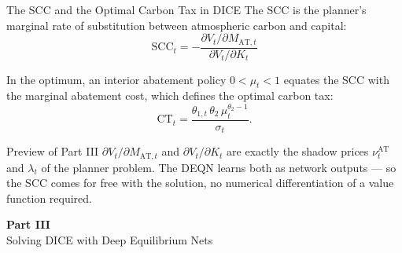 \documentclass[aspectratio=169,11pt]{beamer}
\newcommand{\emphc}[1]{\textcolor{harvardcrimson}{#1}}
\begin{document}
\begin{frame}{The SCC and the Optimal Carbon Tax in DICE}
The SCC is the planner's marginal rate of substitution between atmospheric carbon and capital:
\[
\boxed{\;\mathrm{SCC}_t = -\frac{\partial V_t / \partial M_{\text{AT},t}}{\partial V_t / \partial K_t}\;}
\]

In the optimum, an interior abatement policy $0 < \mu_t < 1$ equates the SCC with the marginal abatement cost, which defines the optimal carbon tax:
\[
\mathrm{CT}_t = \frac{\theta_{1,t}\, \theta_2\, \mu_t^{\theta_2-1}}{\sigma_t}.
\]

\vspace{0.3cm}
\begin{block}{Preview of Part III}
$\partial V_t / \partial M_{\text{AT},t}$ and $\partial V_t / \partial K_t$ are exactly the \emphc{shadow prices} $\nu^{\text{AT}}_t$ and $\lambda_t$ of the planner problem. The DEQN learns both as network outputs --- so the SCC comes \emphc{for free} with the solution, no numerical differentiation of a value function required.
\end{block}
\end{frame}



\begin{frame}{}
\vfill
\begin{center}
{\Huge \textcolor{uzhblue}{\textbf{Part III}}}\\[12pt]
{\LARGE Solving DICE with Deep Equilibrium Nets}
\end{center}
\vfill
\end{frame}
\end{document}
